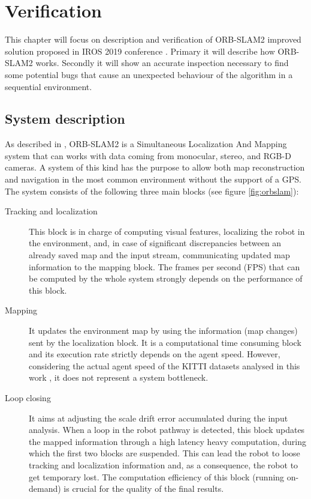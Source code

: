 \chapter{Verification} \label{chap:verification}
This chapter will focus on description and verification of ORB-SLAM2 \cite{murORB2} improved solution proposed in IROS 2019 conference \cite{iros2019}. Primary it will describe how ORB-SLAM2 works. Secondly it will show an accurate inspection necessary to find some potential bugs that cause an unexpected behaviour of the algorithm in a sequential environment.

 \section{System description}
 As described in \cite{iros2019}, ORB-SLAM2 is a Simultaneous Localization And Mapping system that can works with data coming from monocular, stereo, and RGB-D cameras. A system of this kind has the purpose to allow both map reconstruction and navigation in the most common environment without the support of a GPS.
 The system consists of the following three main blocks (see figure \ref{fig:orbslam}):

\begin{description}
	\item[Tracking and localization] 
	This block is in charge of computing visual features, localizing the robot in the environment, and, in case of significant discrepancies between an already saved map and the input stream, communicating updated map information to the mapping block. The frames per second (FPS) that can be computed by the whole system strongly depends on the performance of this block.
	\item[Mapping] 
	It updates the environment map by using the information (map changes) sent by the localization block. It is a computational time consuming block and its execution rate strictly depends on the agent speed. However, considering the actual agent speed of the KITTI datasets analysed in this work \cite{CVPR2012}, it does not represent a system bottleneck.
	\item[Loop closing] 
	It aims at adjusting the scale drift error accumulated during the input analysis. When a loop in the robot pathway is detected, this block updates the mapped information through a high latency heavy computation, during which the first two blocks are suspended. This can lead the robot to loose tracking and localization information and, as a consequence, the robot to get temporary lost. The computation efficiency of this block (running on-demand) is crucial for the quality of the final results.
\end{description}

